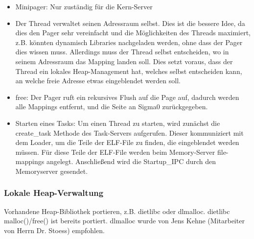 \begin{itemize}
	\item Minipager: Nur zuständig für die Kern-Server
	\item Der Thread verwaltet seinen Adressraum selbst. Dies ist die bessere Idee, da dies den Pager sehr vereinfacht und die Möglichkeiten des Threads maximiert, z.B. könnten dynamisch Libraries nachgeladen werden, ohne dass der Pager dies wissen muss. Allerdings muss  der Thread selbst entscheiden, wo in seinem Adressraum das Mapping landen soll. Dies setzt voraus, dass der Thread ein lokales Heap-Management hat, welches selbst entscheiden kann, an welche freie Adresse etwas eingeblendet werden soll.
	
	\item free: Der Pager ruft ein rekursives Flush auf die Page auf, dadurch werden alle Mappings entfernt, und die Seite an Sigma0 zurückgegeben.
    \item Starten eines Tasks: Um einen Thread zu starten, wird zunächst
        die create\_task Methode des Task-Servers aufgerufen. Dieser
        kommuniziert mit dem Loader, um die Teile der ELF-File zu
        finden, die eingeblendet werden müssen. Für diese Teile der
        ELF-File werden beim Memory-Server file-mappings angelegt.
        Anschließend wird die Startup\_IPC durch den Memoryserver
        gesendet.
\end{itemize}

\subsubsection{Lokale Heap-Verwaltung}

Vorhandene Heap-Bibliothek portieren, z.B. dietlibc oder dlmalloc. dietlibc malloc()/free() ist bereits portiert. dlmalloc wurde von Jens Kehne (Mitarbeiter von Herrn Dr. Stoess) empfohlen.

